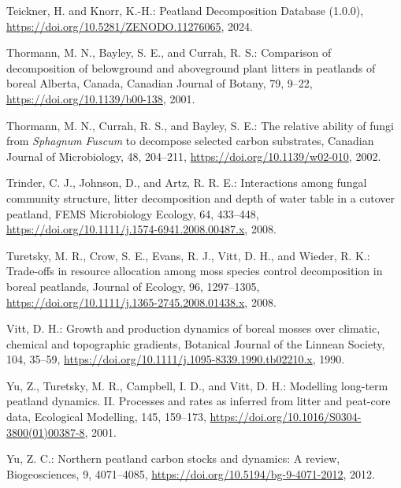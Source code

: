 \documentclass[
  12pt,
]{article}
\newlength{\cslhangindent}
\newlength{\cslentryspacingunit} %
\newenvironment{CSLReferences}[2] %
 {%
  \setlength{\parindent}{0pt}
  \ifodd #1
  \let\oldpar\par
  \def\par{\hangindent=\cslhangindent\oldpar}
  \fi
  \setlength{\parskip}{#2\cslentryspacingunit}
 }%
 {}
\begin{document}
\begin{CSLReferences}{0}{0}
\leavevmode{}%
Teickner, H. and Knorr, K.-H.: Peatland {Decomposition Database} (1.0.0), \url{https://doi.org/10.5281/ZENODO.11276065}, 2024.

\leavevmode{}%
Thormann, M. N., Bayley, S. E., and Currah, R. S.: Comparison of decomposition of belowground and aboveground plant litters in peatlands of boreal {Alberta}, {Canada}, Canadian Journal of Botany, 79, 9--22, \url{https://doi.org/10.1139/b00-138}, 2001.

\leavevmode{}%
Thormann, M. N., Currah, R. S., and Bayley, S. E.: The relative ability of fungi from {\emph{Sphagnum}}{ \emph{Fuscum}} to decompose selected carbon substrates, Canadian Journal of Microbiology, 48, 204--211, \url{https://doi.org/10.1139/w02-010}, 2002.

\leavevmode{}%
Trinder, C. J., Johnson, D., and Artz, R. R. E.: Interactions among fungal community structure, litter decomposition and depth of water table in a cutover peatland, FEMS Microbiology Ecology, 64, 433--448, \url{https://doi.org/10.1111/j.1574-6941.2008.00487.x}, 2008.

\leavevmode{}%
Turetsky, M. R., Crow, S. E., Evans, R. J., Vitt, D. H., and Wieder, R. K.: Trade-offs in resource allocation among moss species control decomposition in boreal peatlands, Journal of Ecology, 96, 1297--1305, \url{https://doi.org/10.1111/j.1365-2745.2008.01438.x}, 2008.

\leavevmode{}%
Vitt, D. H.: Growth and production dynamics of boreal mosses over climatic, chemical and topographic gradients, Botanical Journal of the Linnean Society, 104, 35--59, \url{https://doi.org/10.1111/j.1095-8339.1990.tb02210.x}, 1990.

\leavevmode{}%
Yu, Z., Turetsky, M. R., Campbell, I. D., and Vitt, D. H.: Modelling long-term peatland dynamics. {II}. {Processes} and rates as inferred from litter and peat-core data, Ecological Modelling, 145, 159--173, \url{https://doi.org/10.1016/S0304-3800(01)00387-8}, 2001.

\leavevmode{}%
Yu, Z. C.: Northern peatland carbon stocks and dynamics: A review, Biogeosciences, 9, 4071--4085, \url{https://doi.org/10.5194/bg-9-4071-2012}, 2012.

\end{CSLReferences}
\end{document}
